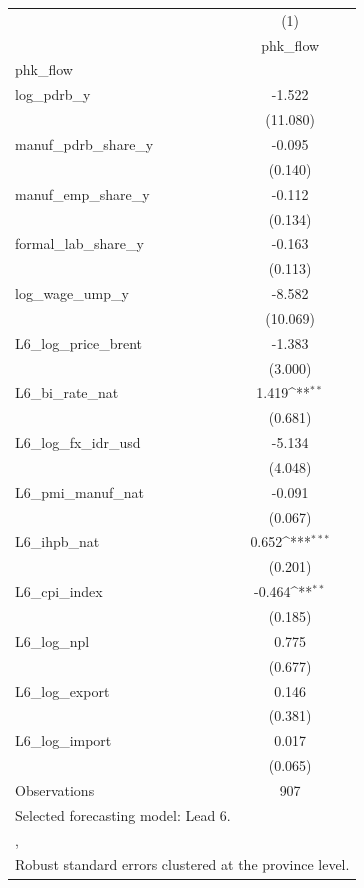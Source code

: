 {
\def\sym#1{\ifmmode^{#1}\else\(^{#1}\)\fi}
\begin{tabular}{l*{1}{c}}
\toprule
                &\multicolumn{1}{c}{(1)}\\
                &\multicolumn{1}{c}{phk\_flow}\\
\midrule
phk\_flow        &                  \\
log\_pdrb\_y      &   -1.522         \\
                & (11.080)         \\
\addlinespace
manuf\_pdrb\_share\_y&   -0.095         \\
                &  (0.140)         \\
\addlinespace
manuf\_emp\_share\_y&   -0.112         \\
                &  (0.134)         \\
\addlinespace
formal\_lab\_share\_y&   -0.163         \\
                &  (0.113)         \\
\addlinespace
log\_wage\_ump\_y  &   -8.582         \\
                & (10.069)         \\
\addlinespace
L6\_log\_price\_brent&   -1.383         \\
                &  (3.000)         \\
\addlinespace
L6\_bi\_rate\_nat  &    1.419\sym{**} \\
                &  (0.681)         \\
\addlinespace
L6\_log\_fx\_idr\_usd&   -5.134         \\
                &  (4.048)         \\
\addlinespace
L6\_pmi\_manuf\_nat&   -0.091         \\
                &  (0.067)         \\
\addlinespace
L6\_ihpb\_nat     &    0.652\sym{***}\\
                &  (0.201)         \\
\addlinespace
L6\_cpi\_index    &   -0.464\sym{**} \\
                &  (0.185)         \\
\addlinespace
L6\_log\_npl      &    0.775         \\
                &  (0.677)         \\
\addlinespace
L6\_log\_export   &    0.146         \\
                &  (0.381)         \\
\addlinespace
L6\_log\_import   &    0.017         \\
                &  (0.065)         \\
\midrule
Observations    &      907         \\
\bottomrule
\multicolumn{2}{l}{\footnotesize Selected forecasting model: Lead 6.}\\
\multicolumn{2}{l}{\footnotesize ,}\\
\multicolumn{2}{l}{\footnotesize Robust standard errors clustered at the province level.}\\
\end{tabular}
}
